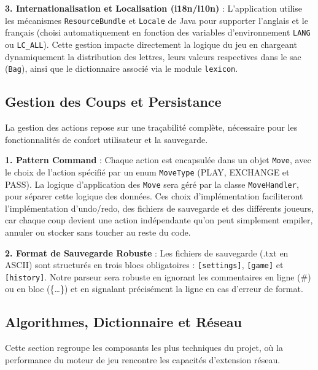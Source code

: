 \documentclass[a4paper]{article}
\begin{document}
\vspace{1\baselineskip}
\hangindent=1.5cm
\textbf{3. Internationalisation et Localisation (i18n/l10n)} : L'application utilise les mécanismes \texttt{ResourceBundle} et \texttt{Locale} de Java pour supporter l'anglais et le français (choisi automatiquement en fonction des variables d’environnement \texttt{LANG} ou \texttt{LC\_ALL}). Cette gestion impacte directement la logique du jeu en chargeant dynamiquement la distribution des lettres, leurs valeurs respectives dans le sac (\texttt{Bag}), ainsi que le dictionnaire associé via le module \texttt{lexicon}.

\subsection{Gestion des Coups et Persistance}
\hangindent=0.8mm
La gestion des actions repose sur une traçabilité complète, nécessaire pour les fonctionnalités de confort utilisateur et la sauvegarde.

\hangindent=1.5cm
\textbf{1. Pattern Command} : Chaque action est encapsulée dans un objet \texttt{Move}, avec le choix de l’action spécifié par un enum \texttt{MoveType} (PLAY, EXCHANGE et PASS). La logique d’application des \texttt{Move} sera géré par la classe \texttt{MoveHandler}, pour séparer cette logique des données. Ces choix d’implémentation faciliteront l’implémentation d’undo/redo, des fichiers de sauvegarde et des différents joueurs, car chaque coup devient une action indépendante qu'on peut simplement empiler, annuler ou stocker sans toucher au reste du code.

\vspace{1\baselineskip}
\hangindent=1.5cm
\textbf{2. Format de Sauvegarde Robuste} : Les fichiers de sauvegarde (.txt en ASCII) sont structurés en trois blocs obligatoires : \texttt{[settings]}, \texttt{[game]} et \texttt{[history]}. Notre parseur sera robuste en ignorant les commentaires en ligne (\#) ou en bloc (\{\dots\}) et en signalant précisément la ligne en cas d'erreur de format.

\subsection{Algorithmes, Dictionnaire et Réseau}
\hangindent=0.8mm
Cette section regroupe les composants les plus techniques du projet, où la performance du moteur de jeu rencontre les capacités d'extension réseau.
\end{document}
